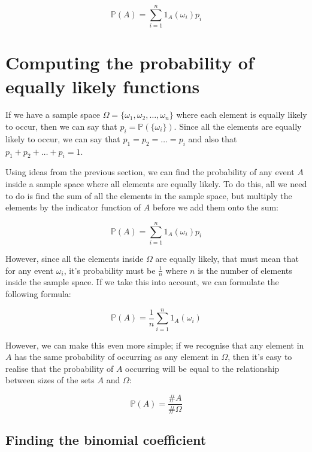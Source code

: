 \begin{dmath}
	\mathbb{P}(A) = \sum\limits_{i=1}^n1_A(\omega_i)p_i
\end{dmath}


\section{Computing the probability of equally likely functions}

If we have a sample space $\Omega = \{ \omega_1, \omega_2, \dots, \omega_n \}$
where each element is equally likely to occur, then we can say that $p_i =
\mathbb{P}(\{\omega_i\})$. Since all the elements are equally likely to occur,
we can say that $p_1 = p_2 = \dots = p_i$ and also that $p_1 + p_2 + \dots + p_i
= 1$.

Using ideas from the previous section, we can find the probability of any event
$A$ inside a sample space where all elements are equally likely. To do this, all
we need to do is find the sum of all the elements in the sample space, but
multiply the elements by the indicator function of $A$ before we add them onto
the sum:

\begin{dmath}
	\mathbb{P}(A) = \sum\limits_{i=1}^{n} 1_A(\omega_i)p_i
\end{dmath}

However, since all the elements inside $\Omega$ are equally likely, that must
mean that for any event $\omega_i$, it's probability must be $\frac{1}{n}$ where
$n$ is the number of elements inside the sample space. If we take this into
account, we can formulate the following formula:

\begin{dmath}
	\mathbb{P}(A) = \frac{1}{n}\sum\limits_{i=1}^{n} 1_A(\omega_i)
\end{dmath}


However, we can make this even more simple; if we recognise that any element in
$A$ has the same probability of occurring as any element in $\Omega$, then it's
easy to realise that the probability of $A$ occurring will be equal to the
relationship between sizes of the sets $A$ and $\Omega$:

\begin{dmath}
	\mathbb{P}(A) = \frac{\#A}{\#\Omega}
\end{dmath}

\subsection{Finding the binomial coefficient}

